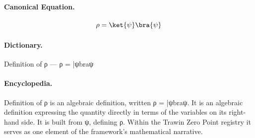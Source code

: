 \paragraph{Canonical Equation.}
\[
\rho = \ket{\psi}\bra{\psi}
\]

\paragraph{Dictionary.}
Definition of ρ — ρ = |ψbraψ

\paragraph{Encyclopedia.}
Definition of ρ is an algebraic definition, written ρ = |ψbraψ. It is an algebraic definition expressing the quantity directly in terms of the variables on its right-hand side. It is built from ψ, defining ρ. Within the Trawin Zero Point registry it serves as one element of the framework's mathematical narrative.
